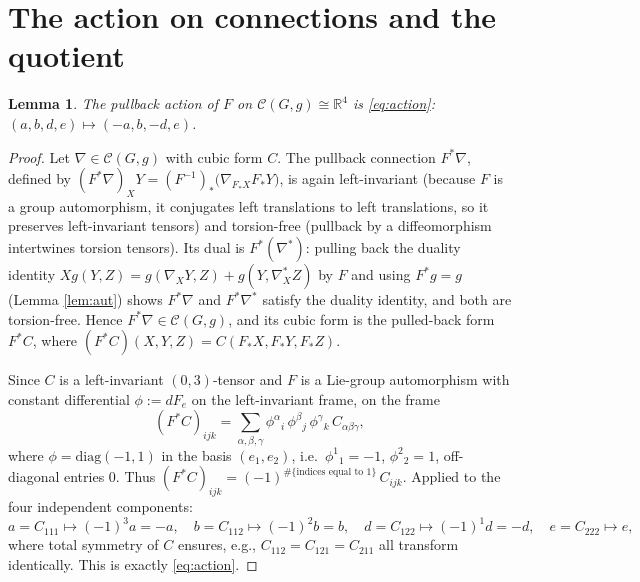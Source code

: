 \documentclass{amsart}
\newtheorem{lemma}{Lemma}
\theoremstyle{definition}
\theoremstyle{remark}
\begin{document}
\section{The action on connections and the quotient}\label{sec:quotient}

\begin{lemma}\label{lem:actC}
The pullback action of $F$ on $\mathcal C(G,g)\cong\mathbb R^4$ is \eqref{eq:action}:
$(a,b,d,e)\mapsto(-a,b,-d,e)$.
\end{lemma}

\begin{proof}
Let $\nabla\in\mathcal C(G,g)$ with cubic form $C$. The pullback connection $F^{*}\nabla$, defined by
$(F^{*}\nabla)_XY=(F^{-1})_{*}\bigl(\nabla_{F_{*}X}F_{*}Y\bigr)$, is again left-invariant (because $F$ is a group
automorphism, it conjugates left translations to left translations, so it preserves left-invariant tensors) and
torsion-free (pullback by a diffeomorphism intertwines torsion tensors). Its dual is $F^{*}(\nabla^{*})$: pulling
back the duality identity $X g(Y,Z)=g(\nabla_XY,Z)+g(Y,\nabla^{*}_XZ)$ by $F$ and using $F^{*}g=g$ (Lemma
\ref{lem:aut}) shows $F^{*}\nabla$ and $F^{*}\nabla^{*}$ satisfy the duality identity, and both are torsion-free.
Hence $F^{*}\nabla\in\mathcal C(G,g)$, and its cubic form is the pulled-back form $F^{*}C$, where
$(F^{*}C)(X,Y,Z)=C(F_{*}X,F_{*}Y,F_{*}Z)$.

Since $C$ is a left-invariant $(0,3)$-tensor and $F$ is a Lie-group automorphism with constant differential
$\phi:=dF_e$ on the left-invariant frame, on the frame
\[
(F^{*}C)_{ijk}=\sum_{\alpha,\beta,\gamma}\phi^{\alpha}{}_{i}\,\phi^{\beta}{}_{j}\,\phi^{\gamma}{}_{k}\,C_{\alpha\beta\gamma},
\]
where $\phi=\mathrm{diag}(-1,1)$ in the basis $(e_1,e_2)$, i.e.\ $\phi^1{}_1=-1$, $\phi^2{}_2=1$, off-diagonal
entries $0$. Thus $(F^{*}C)_{ijk}=(-1)^{\#\{\text{indices equal to }1\}}\,C_{ijk}$. Applied to the four
independent components:
\[
a=C_{111}\mapsto(-1)^3a=-a,\quad
b=C_{112}\mapsto(-1)^2b=b,\quad
d=C_{122}\mapsto(-1)^1d=-d,\quad
e=C_{222}\mapsto e,
\]
where total symmetry of $C$ ensures, e.g., $C_{112}=C_{121}=C_{211}$ all transform identically. This is exactly
\eqref{eq:action}.
\end{proof}
\end{document}
